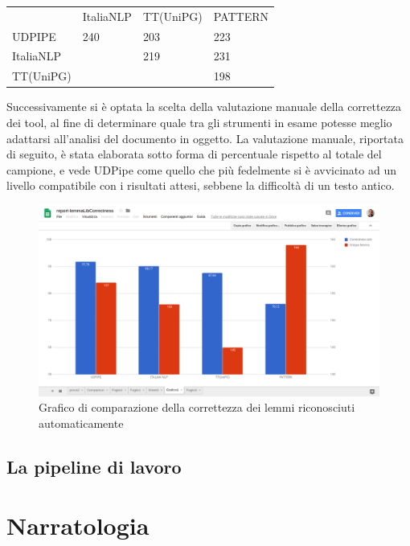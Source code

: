 \begin{longtable}[]{@{}llll@{}}
\toprule
& ItaliaNLP & TT(UniPG) & PATTERN\tabularnewline
UDPIPE & 240 & 203 & 223\tabularnewline
ItaliaNLP & & 219 & 231\tabularnewline
TT(UniPG) & & & 198\tabularnewline
\bottomrule
\end{longtable}

Successivamente si è optata la scelta della valutazione manuale della
correttezza dei tool, al fine di determinare quale tra gli strumenti in
esame potesse meglio adattarsi all'analisi del documento in oggetto. La
valutazione manuale, riportata di seguito, è stata elaborata sotto forma
di percentuale rispetto al totale del campione, e vede UDPipe come
quello che più fedelmente si è avvicinato ad un livello compatibile con
i risultati attesi, sebbene la difficoltà di un testo antico.

\begin{figure}
\centering
\includegraphics[width=1.00000\textwidth]{../charts/correctnessLib-Lemma2.png}
\caption{Grafico di comparazione della correttezza dei lemmi
riconosciuti automaticamente}
\end{figure}

\subsection{La pipeline di lavoro}\label{la-pipeline-di-lavoro}

\section{Narratologia}\label{narratologia}

